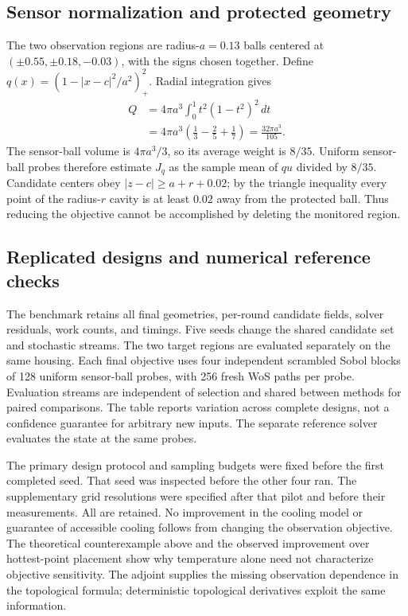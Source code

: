 \subsection{Sensor normalization and protected geometry}
The two observation regions are radius-$a=0.13$ balls centered at
$(\pm0.55,\pm0.18,-0.03)$, with the signs chosen together. Define
$q(x)=(1-|x-c|^2/a^2)_+^2$. Radial integration gives
\begin{align*}
 Q&=4\pi a^3\int_0^1 t^2(1-t^2)^2\,dt\\
  &=4\pi a^3\left(\frac13-\frac25+\frac17\right)
    =\frac{32\pi a^3}{105}.
\end{align*}
The sensor-ball volume is $4\pi a^3/3$, so its average weight is
$8/35$. Uniform sensor-ball probes therefore estimate $J_q$ as the
sample mean of $qu$ divided by $8/35$. Candidate centers obey
$|z-c|\geq a+r+0.02$; by the triangle inequality every point of the
radius-$r$ cavity is at least $0.02$ away from the protected ball.
Thus reducing the objective cannot be accomplished by deleting
the monitored region.

\subsection{Replicated designs and numerical reference checks}

The benchmark retains all final geometries, per-round candidate fields,
solver residuals, work counts, and timings. Five seeds change the shared
candidate set and stochastic streams. The two target regions are evaluated
separately on the same housing. Each final objective uses four independent
scrambled Sobol blocks of 128 uniform sensor-ball probes, with 256 fresh
WoS paths per probe. Evaluation streams are independent of selection and
shared between methods for paired comparisons. The table reports variation
across complete designs, not a confidence guarantee for arbitrary new inputs.
The separate reference solver evaluates the state at the same probes.


The primary design protocol and sampling budgets were fixed before the
first completed seed. That seed was inspected before the other four ran.
The supplementary grid resolutions were specified after that pilot and
before their measurements. All are retained. No improvement in the
cooling model or guarantee of accessible cooling follows from changing
the observation objective. The theoretical counterexample above and
the observed improvement over hottest-point placement show why temperature
alone need not characterize objective sensitivity. The adjoint supplies the
missing observation dependence in the topological formula; deterministic
topological derivatives exploit the same information.
